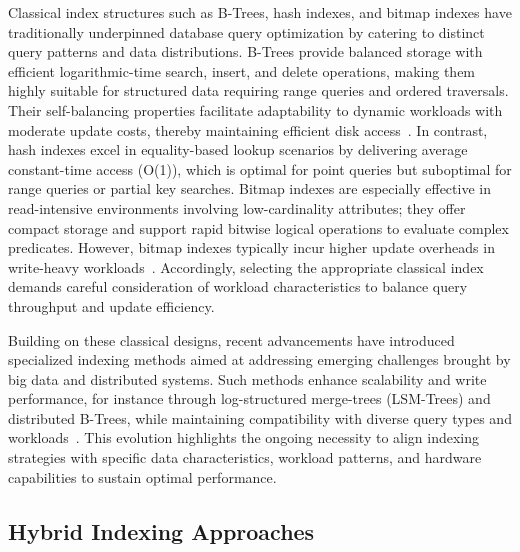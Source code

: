 \documentclass[sigconf]{acmart}
\begin{document}
Classical index structures such as B-Trees, hash indexes, and bitmap indexes have traditionally underpinned database query optimization by catering to distinct query patterns and data distributions. B-Trees provide balanced storage with efficient logarithmic-time search, insert, and delete operations, making them highly suitable for structured data requiring range queries and ordered traversals. Their self-balancing properties facilitate adaptability to dynamic workloads with moderate update costs, thereby maintaining efficient disk access~\cite{ref31}. In contrast, hash indexes excel in equality-based lookup scenarios by delivering average constant-time access (O(1)), which is optimal for point queries but suboptimal for range queries or partial key searches. Bitmap indexes are especially effective in read-intensive environments involving low-cardinality attributes; they offer compact storage and support rapid bitwise logical operations to evaluate complex predicates. However, bitmap indexes typically incur higher update overheads in write-heavy workloads~\cite{ref31}. Accordingly, selecting the appropriate classical index demands careful consideration of workload characteristics to balance query throughput and update efficiency.

Building on these classical designs, recent advancements have introduced specialized indexing methods aimed at addressing emerging challenges brought by big data and distributed systems. Such methods enhance scalability and write performance, for instance through log-structured merge-trees (LSM-Trees) and distributed B-Trees, while maintaining compatibility with diverse query types and workloads~\cite{ref31}. This evolution highlights the ongoing necessity to align indexing strategies with specific data characteristics, workload patterns, and hardware capabilities to sustain optimal performance.

\subsection{Hybrid Indexing Approaches}
\end{document}
